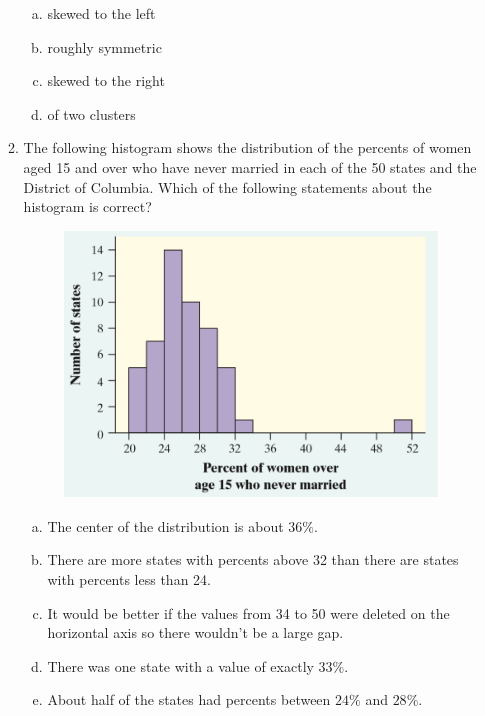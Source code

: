 \documentclass[a4paper,12pt,twoside]{book}
\begin{document}
\begin{itemize}
\begin{enumerate}
    \begin{enumerate}[(a), start = 1]
    \item skewed to the left
    \item roughly symmetric
    \item skewed to the right
    \item of two clusters
    \end{enumerate}
    
 \vspace{0.3cm}
 \item  The following histogram shows the distribution of the percents of women aged 15 and over who have never married in each of the 50 states and the District of Columbia. Which of the following statements about the histogram is correct? 
 
     \begin{figure}[H]
       \centering
       \includegraphics[scale=0.3]{figure2.png}
     \end{figure}
     
     \begin{enumerate}[(a), start = 1]
    \item The center of the distribution is about $36\%$.
    \item There are more states with percents above 32 than there are states with percents less than 24.
    \item It would be better if the values from 34 to 50 were deleted on the horizontal axis so there wouldn’t be a large gap. 
    \item There was one state with a value of exactly $33\%$.
    \item About half of the states had percents between $24\%$ and $28\%$. 
    \end{enumerate}  
    \vspace{0.3cm}  
    

\end{enumerate}
\end{itemize}
\end{document}
